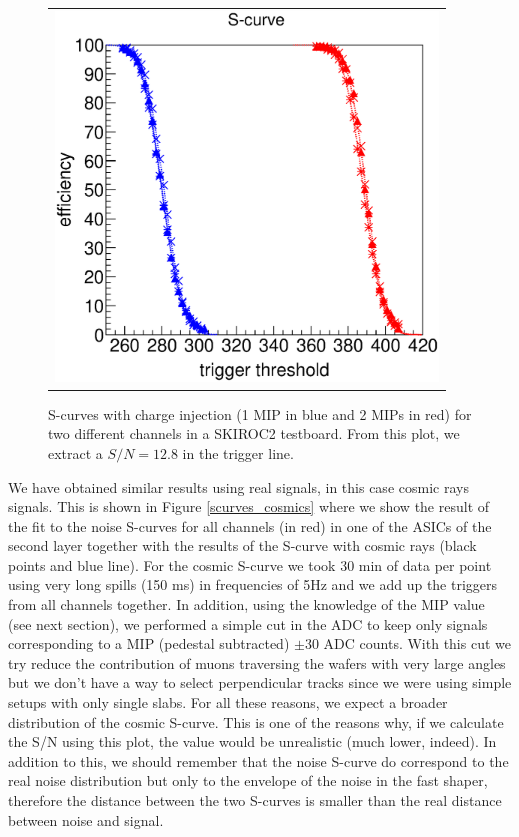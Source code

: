 \documentclass[a4paper,11pt]{article}
\begin{document}
\begin{figure}[!t]
    \centering
  \begin{tabular}{l}
	\includegraphics[width=4in]{figs/commissioning/scurve_pp_fastshaper_ch.eps} \\
	\end{tabular}
\caption{S-curves with charge injection (1 MIP in blue and 2 MIPs in red) for two different channels in a SKIROC2 testboard. From this plot, we extract a $S/N = 12.8$ in the trigger line.}
\label{scurves_injection}
\end{figure}


We have obtained similar results using real signals, in this case cosmic rays signals. This is shown 
in Figure \ref{scurves_cosmics}  where 
we show the result of the fit to the noise S-curves for all channels (in red) in one of the ASICs of 
the second layer together with the results of the S-curve with cosmic rays (black points and blue 
line). For the cosmic S-curve we took 30 min of data per point using very long spills (150 ms) in 
frequencies of 5Hz and we add up the triggers from all channels together. In addition, using the 
knowledge of the MIP value (see next section), we performed a simple cut in the ADC
to keep only signals corresponding to a MIP 
(pedestal subtracted) $\pm30$ ADC counts. With this cut we try reduce the contribution of muons 
traversing the wafers with very large angles but we don't have a way to select perpendicular tracks 
since we were using simple setups with only single slabs. For all these reasons, we expect
a broader distribution of the cosmic S-curve. This is one of the reasons why, if we calculate the S/N 
using this plot, the value would be unrealistic (much lower, indeed). 
In addition to this, we should remember that the noise S-curve do correspond to the real noise 
distribution but only to the envelope of the noise in the fast shaper, therefore the
distance between the two S-curves is smaller than the real distance between noise and signal.
\end{document}
